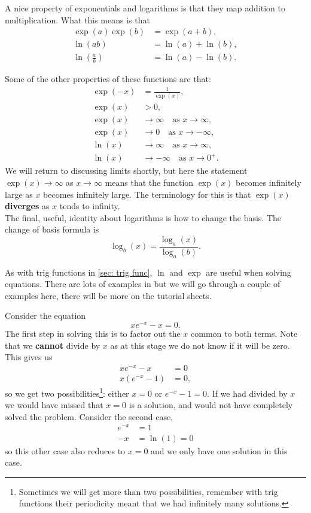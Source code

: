 A nice property of exponentials and logarithms is that they map addition to multiplication. What this means is that
\begin{align*}
\exp(a)\exp(b)&=\exp(a+b),\\
\ln(ab)&=\ln(a)+\ln(b),\\
\ln\left(\frac{a}{b}\right)&=\ln(a)-\ln(b).
\end{align*}

Some of the other properties of these functions are that:
\begin{align*}
\exp(-x)&=\frac{1}{\exp(x)},\\
\exp(x)&>0,\\
\exp(x)&\to \infty \quad \text{as } x\to \infty,\\
\exp(x)&\to 0 \quad \text{as } x\to -\infty,\\
\ln(x) &\to \infty \quad \text{as } x\to \infty,\\
\ln(x)&\to -\infty \quad \text{as } x\to 0^{+}.
\end{align*}
We will return to discussing limits shortly, but here the statement $\exp(x)\to \infty$ as $x\to \infty$ means that the function $\exp(x)$ becomes infinitely large as $x$ becomes infinitely large. The terminology for this is that $\exp(x)$ \textbf{diverges} as $x$ tends to infinity.\\

The final, useful, identity about logarithms is how to change the basis. The change of basis formula is
\begin{equation}
\log_{b}(x)=\frac{\log_{a}(x)}{\log_{a}(b)}.
\label{eq:log change of base}
\end{equation}

As with trig functions in \cref{sec: trig func}, $\ln$ and $\exp$ are useful when solving equations. There are lots of examples in \citep{calcI} but we will go through a couple of examples here, there will be more on the tutorial sheets.

\begin{ex}
Consider the equation
\begin{equation*}
x e^{-x} -x =0.
\end{equation*}
The first step in solving this is to factor out the $x$ common to both terms. Note that we \textbf{cannot} divide by $x$ as at this stage we do not know if it will be zero. This gives us
\begin{align*}
x e^{-x} -x &=0\\
x\left(e^{-x}-1\right)&=0,
\end{align*}
so we get two possibilities\footnote{Sometimes we will get more than two possibilities, remember with trig functions their periodicity meant that we had infinitely many solutions.}: either $x=0$ or $e^{-x}-1=0$. If we had divided by $x$ we would have missed that $x=0$ is a solution, and would not have completely solved the problem. Consider the second case,
\begin{align*}
e^{-x}&=1\\
-x&=\ln(1)=0
\end{align*}
so this other case also reduces to $x=0$ and we only have one solution in this case.
\end{ex}

